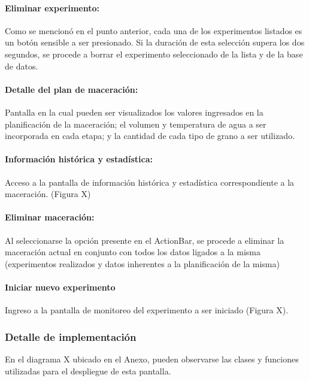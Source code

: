                 \paragraph{Eliminar experimento:}
                 Como se mencionó en el punto anterior, cada una de los experimentos listados es un botón sensible a ser presionado. Si la duración de esta selección supera los dos segundos, se procede a borrar el experimento seleccionado de la lista y de la base de datos.
                 
                \paragraph{Detalle del plan de maceración:}
                 Pantalla en la cual pueden ser visualizados los valores ingresados en la planificación de la maceración; el volumen y temperatura de agua a ser incorporada en cada etapa; y la cantidad de cada tipo de grano a ser utilizado.
                
                \paragraph{Información histórica y estadística:}
                Acceso a la pantalla de información histórica y estadística correspondiente a la maceración. (Figura X)
                
                \paragraph{Eliminar maceración:}
                Al seleccionarse la opción presente en el ActionBar, se procede a eliminar la maceración actual en conjunto con todos los datos ligados a la misma (experimentos realizados y datos inherentes a la planificación de la misma)
                
                \paragraph{Iniciar nuevo experimento}
                Ingreso a la pantalla de monitoreo del experimento a ser iniciado (Figura X).
            
            \subsubsection{Detalle de implementación}
                En el diagrama X ubicado en el Anexo, pueden observarse las clases y funciones utilizadas para el despliegue de esta pantalla.
            
